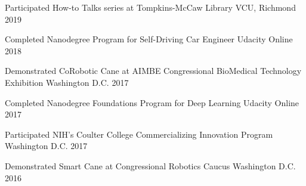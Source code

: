 
\begin{cvhonors}
	\myevent
	{Participated How-to Talks series at Tompkins-McCaw Library}
	{VCU, Richmond}
	{2019}
	
	\myevent
	{Completed Nanodegree Program for Self-Driving Car Engineer}
	{Udacity Online}
	{2018}
	
	\myevent
	{Demonstrated CoRobotic Cane at AIMBE Congressional BioMedical Technology Exhibition}
	{Washington D.C.}
	{2017}
	
	\myevent
	{Completed Nanodegree Foundations Program for Deep Learning}
	{Udacity Online}
	{2017}
	
	\myevent
	{Participated NIH’s Coulter College Commercializing Innovation Program}
	{Washington D.C.}
	{2017}
	
	\myevent
	{Demonstrated Smart Cane at Congressional Robotics Caucus}
	{Washington D.C.}
	{2016}
	
	
\end{cvhonors}




